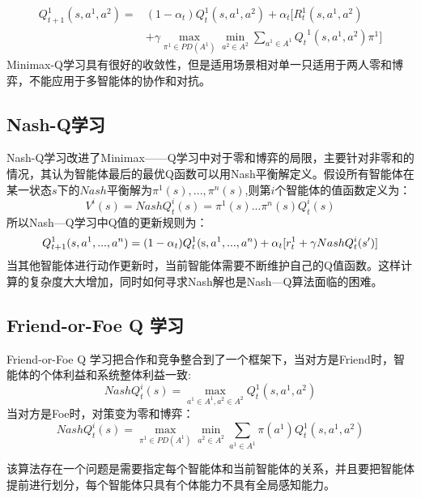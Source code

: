 \begin{equation}
\begin{aligned}
Q_{t + 1}^1(s,{a^1},{a^2}) =& (1 - {\alpha _t})Q_t^1(s,{a^1},{a^2}) + {\alpha _t}[R_t^1(s,{a^1},{a^2}) \\& + \gamma\mathop {\max }\limits_{{\pi ^1} \in PD({A^1})} \mathop {\min }\limits_{{a^2} \in {A^2}} \sum\limits_{{a^1} \in {A^1}} {{Q_t}^1(s,{a^1},{a^2})} {\pi ^1} ]
\end{aligned}
\end{equation}
Minimax-Q学习具有很好的收敛性，但是适用场景相对单一只适用于两人零和博弈，不能应用于多智能体的协作和对抗。
\subsection{Nash-Q学习}
Nash-Q学习改进了Minimax——Q学习中对于零和博弈的局限，主要针对非零和的情况，其认为智能体最后的最优Q函数可以用Nash平衡解定义。假设所有智能体在某一状态$s$下的$Nash$平衡解为${\pi ^1}(s),...,{\pi ^n}(s)$,则第$i$个智能体的值函数定义为：
\begin{equation}
	{V^i}(s) = NashQ_t^i(s) = {\pi ^1}(s)...{\pi ^n}(s)Q_t^i(s)
\end{equation}
所以Nash—Q学习中Q值的更新规则为：
\begin{equation}
Q_{t + 1}^1(s,{a^1},...,{a^n}) = (1 - {\alpha _t})Q_t^1({\rm{s}},{a^1},...,{a^n}) + {\alpha _t}[r_t^1 + \gamma NashQ_t^i(s')]
\end{equation}
当其他智能体进行动作更新时，当前智能体需要不断维护自己的Q值函数。这样计算的复杂度大大增加，同时如何寻求Nash解也是Nash—Q算法面临的困难。
\subsection{Friend-or-Foe Q 学习}
Friend-or-Foe Q 学习把合作和竞争整合到了一个框架下，当对方是Friend时，智能体的个体利益和系统整体利益一致:
\begin{equation}
NashQ_t^i(s) = \mathop {\max }\limits_{{a^1} \in {A^1},{a^2} \in {A^2}} Q_t^1(s,{a^1},{a^2})
\end{equation}
当对方是Foe时，对策变为零和博弈：
\begin{equation}
	NashQ_t^i(s) = \mathop {\max }\limits_{{\pi ^1} \in PD({A^1})} \mathop {\min }\limits_{{a^2} \in {A^2}} \sum\limits_{{a^1} \in {A^1}} {\pi ({a^1})} Q_t^1(s,{a^1},{a^2})
\end{equation}

该算法存在一个问题是需要指定每个智能体和当前智能体的关系，并且要把智能体提前进行划分，每个智能体只具有个体能力不具有全局感知能力。
